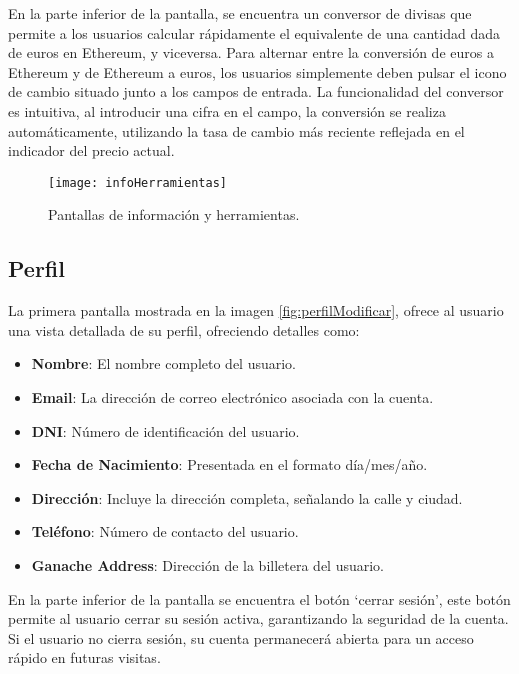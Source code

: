 En la parte inferior de la pantalla, se encuentra un conversor de divisas que permite a los usuarios calcular rápidamente el equivalente de una cantidad dada de euros en Ethereum, y viceversa. Para alternar entre la conversión de euros a Ethereum y de Ethereum a euros, los usuarios simplemente deben pulsar el icono de cambio situado junto a los campos de entrada.
La funcionalidad del conversor es intuitiva, al introducir una cifra en el campo, la conversión se realiza automáticamente, utilizando la tasa de cambio más reciente reflejada en el indicador del precio actual. 

\begin{figure}[h]
	\centering
	\texttt{[image: infoHerramientas]}
	\caption[Pantalla utilidades]{Pantallas de información y herramientas.}
	\label{fig:infoHerramientas}
\end{figure}


\subsection{Perfil}

La primera pantalla mostrada en la imagen \ref{fig:perfilModificar}, ofrece al usuario una vista detallada de su perfil, ofreciendo detalles como:

\begin{itemize}
\item \textbf{Nombre}: El nombre completo del usuario.

\item \textbf{Email}: La dirección de correo electrónico asociada con la cuenta.

\item \textbf{DNI}: Número de identificación del usuario.

\item \textbf{Fecha de Nacimiento}: Presentada en el formato día/mes/año.

\item \textbf{Dirección}: Incluye la dirección completa, señalando la calle y ciudad.

\item \textbf{Teléfono}: Número de contacto del usuario.

\item \textbf{Ganache Address}: Dirección de la billetera del usuario.
\end{itemize}

En la parte inferior de la pantalla se encuentra el botón `cerrar sesión', este botón permite al usuario cerrar su sesión activa, garantizando la seguridad de la cuenta. Si el usuario no cierra sesión, su cuenta permanecerá abierta para un acceso rápido en futuras visitas.

